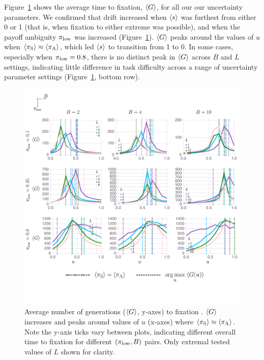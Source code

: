 \documentclass[letterpaper,11.5pt]{scrartcl}
\begin{document}
Figure~\ref{fig:steps} shows the average time to fixation, $\langle G \rangle$, for all our our uncertainty parameters. We confirmed that drift increased when $\langle s \rangle$ was furthest from either 0 or 1 (that is, when fixation to either extreme was possible), 
and when the payoff ambiguity $\pi_{\mathrm{low}}$ was increased (Figure~\ref{fig:steps}). 
$\langle G \rangle$ peaks around the values of $u$ 
when $\langle \pi_\mathrm{S} \rangle \approx \langle \pi_\mathrm{A} \rangle$, which led $\langle s \rangle$ to transition from 1 to 0.
In some cases, especially when $\pi_{\mathrm{low}}=0.8$,
there is no distinct peak in $\langle G \rangle$ across $B$ and $L$ settings, 
indicating little difference in task difficulty across a range of uncertainty
parameter settings (Figure~\ref{fig:steps}, bottom row).


\begin{figure}
  \caption{Average number of generations ($\langle G \rangle$, y-axes) to fixation . 
    $\langle G \rangle$ increases and peaks around values of $u$ (x-axes) where
  $\langle \pi_\mathrm{S} \rangle \approx \langle \pi_\mathrm{A} \rangle$. Note the y-axis ticks vary between plots,
indicating different overall time to fixation for different $(\pi_{\mathrm{low}}, B)$
pairs. Only extremal tested values of $L$ shown for clarity.} 
  \label{fig:steps}
\centering
    \includegraphics[width=\textwidth]{Figures/stepResultsPlots.pdf}
\end{figure}
\end{document}
